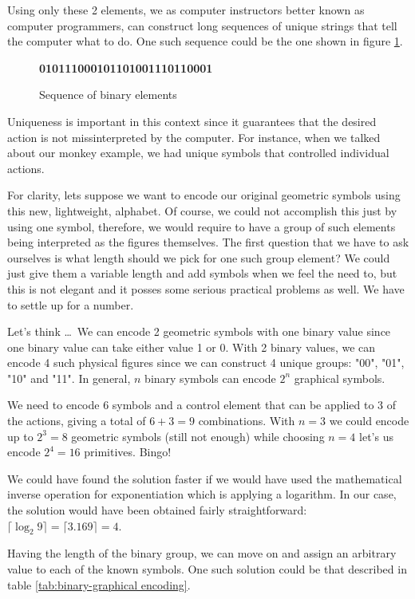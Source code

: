 \documentclass[12pt, a4paper]{book}
\begin{document}
Using only these 2 elements, we as computer instructors better known as computer programmers, can construct long sequences of unique strings that tell the computer what to do. One such sequence could be the one shown in figure \ref{fig:sequence of binary elements}.

\begin{figure}[h]
  \centering
  \huge
  \textbf{010111000101101001110110001}
  \caption{Sequence of binary elements}
  \label{fig:sequence of binary elements}
\end{figure}

Uniqueness is important in this context since it guarantees that the desired action is not missinterpreted by the computer. For instance, when we talked about our monkey example, we had unique symbols that controlled individual actions. 

For clarity, lets suppose we want to encode our original geometric symbols using this new, lightweight, alphabet. Of course, we could not accomplish this just by using one symbol, therefore, we would require to have a group of such elements being interpreted as the figures themselves. The first question that we have to ask ourselves is what length should we pick for one such group element? We could just give them a variable length and add symbols when we feel the need to, but this is not elegant and it posses some serious practical problems as well. We have to settle up for a number.

Let's think \ldots\ We can encode 2 geometric symbols with one binary value since one binary value can take either value 1 or 0. With 2 binary values, we can encode 4 such physical figures since we can construct 4 unique groups: "00", "01", "10" and "11". In general, $n$ binary symbols can encode $2^n$ graphical symbols. 

We need to encode 6 symbols and a control element that can be applied to 3 of the actions, giving a total of $6 + 3 = 9$ combinations. With $n=3$ we could encode up to $2^3=8$ geometric symbols (still not enough) while choosing $n=4$ let's us encode $2^4=16$ primitives. Bingo!

We could have found the solution faster if we would have used the mathematical inverse operation for exponentiation which is applying a  logarithm. In our case, the solution would have been obtained fairly straightforward: $\lceil \log_2 9 \rceil = \lceil 3.169 \rceil = 4$.

Having the length of the binary group, we can move on and assign an arbitrary value to each of the known symbols. One such solution could be that described in table \ref{tab:binary-graphical encoding}.
\end{document}
